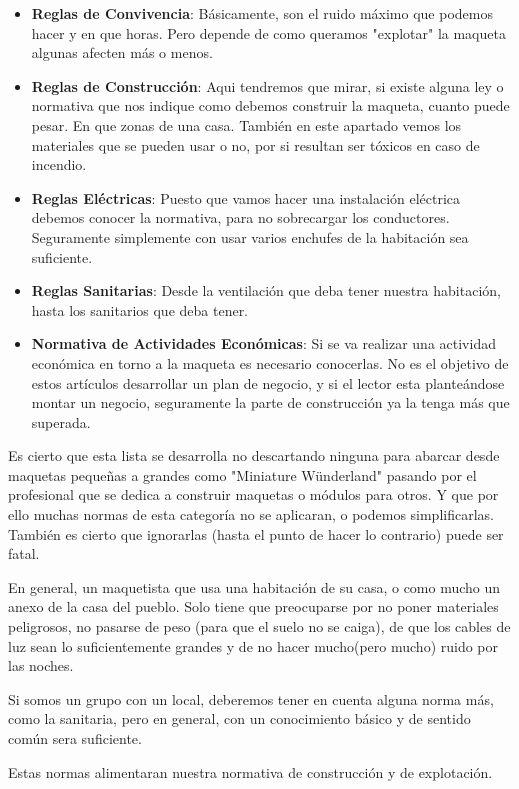\begin{itemize}
	\item \textbf{Reglas de Convivencia}: Básicamente, son el ruido máximo que podemos hacer y en que horas. Pero depende de como queramos "explotar" la maqueta algunas afecten más o menos.
	\item \textbf{Reglas de Construcción}: Aqui tendremos que mirar, si existe alguna ley o normativa que nos indique como debemos construir la maqueta, cuanto puede pesar. En que zonas de una casa. También en este apartado vemos los materiales que se pueden usar o no, por si resultan ser tóxicos en caso de incendio.
	\item \textbf{Reglas Eléctricas}: Puesto que vamos hacer una instalación eléctrica debemos conocer la normativa, para no sobrecargar los conductores. Seguramente simplemente con usar varios enchufes de la habitación sea suficiente.
	\item \textbf{Reglas Sanitarias}: Desde la ventilación que deba tener nuestra habitación, hasta los sanitarios que deba tener.
	\item  \textbf{Normativa de Actividades Económicas}: Si se va realizar una actividad económica en torno a la maqueta es necesario conocerlas. No es el objetivo de estos artículos desarrollar un plan de negocio, y si el lector esta planteándose montar un negocio, seguramente la parte de construcción ya la tenga más que superada.
	
\end{itemize}
Es cierto que esta lista se desarrolla no descartando ninguna para abarcar desde maquetas pequeñas a grandes como "Miniature Wünderland" pasando por el profesional que se dedica a construir maquetas o módulos para otros. Y que por ello muchas normas de esta categoría no se aplicaran, o podemos simplificarlas. También es cierto que ignorarlas (hasta el punto de hacer lo contrario) puede ser fatal.

En general, un maquetista que usa una habitación de su casa, o como mucho un anexo de la casa del pueblo. Solo tiene que preocuparse por no poner materiales peligrosos, no pasarse de peso (para que el suelo no se caiga), de que los cables de luz sean lo suficientemente grandes y de no hacer mucho(pero mucho) ruido por las noches.

Si somos un grupo con un local, deberemos tener en cuenta alguna norma más, como la sanitaria, pero en general, con un conocimiento básico y de sentido común sera suficiente. 

Estas normas alimentaran nuestra normativa de construcción y de explotación.


